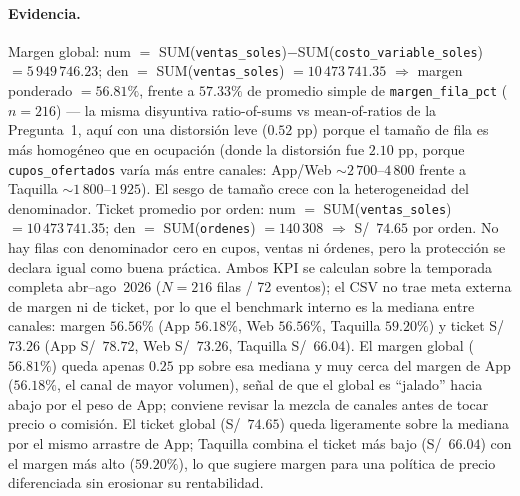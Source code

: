 \paragraph{Evidencia.} Margen global: num $=$ SUM(\lstinline|ventas_soles|)$-$SUM(\lstinline|costo_variable_soles|) $= 5\,949\,746.23$; den $=$ SUM(\lstinline|ventas_soles|) $=10\,473\,741.35$ $\Rightarrow$ margen ponderado $=56.81\%$, frente a $57.33\%$ de promedio simple de \lstinline|margen_fila_pct| ($n=216$) — la misma disyuntiva ratio-of-sums vs mean-of-ratios de la Pregunta~1, aquí con una distorsión leve ($0.52$ pp) porque el tamaño de fila es más homogéneo que en ocupación (donde la distorsión fue $2.10$ pp, porque \lstinline|cupos_ofertados| varía más entre canales: App/Web $\sim 2\,700$--$4\,800$ frente a Taquilla $\sim 1\,800$--$1\,925$). El sesgo de tamaño crece con la heterogeneidad del denominador. Ticket promedio por orden: num $=$ SUM(\lstinline|ventas_soles|) $=10\,473\,741.35$; den $=$ SUM(\lstinline|ordenes|) $=140\,308$ $\Rightarrow$ S/~$74.65$ por orden. No hay filas con denominador cero en cupos, ventas ni órdenes, pero la protección se declara igual como buena práctica. Ambos KPI se calculan sobre la temporada completa abr--ago~2026 ($N=216$ filas / 72 eventos); el CSV no trae meta externa de margen ni de ticket, por lo que el benchmark interno es la mediana entre canales: margen $56.56\%$ (App $56.18\%$, Web $56.56\%$, Taquilla $59.20\%$) y ticket S/~$73.26$ (App S/~$78.72$, Web S/~$73.26$, Taquilla S/~$66.04$). El margen global ($56.81\%$) queda apenas $0.25$ pp sobre esa mediana y muy cerca del margen de App ($56.18\%$, el canal de mayor volumen), señal de que el global es \enquote{jalado} hacia abajo por el peso de App; conviene revisar la mezcla de canales antes de tocar precio o comisión. El ticket global (S/~$74.65$) queda ligeramente sobre la mediana por el mismo arrastre de App; Taquilla combina el ticket más bajo (S/~$66.04$) con el margen más alto ($59.20\%$), lo que sugiere margen para una política de precio diferenciada sin erosionar su rentabilidad.

